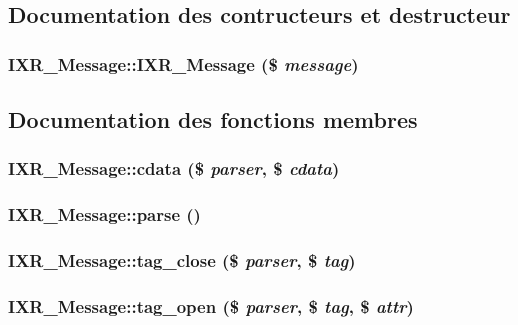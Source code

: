 \subsection{Documentation des contructeurs et destructeur}
\hypertarget{classIXR__Message_a0}{
\subsubsection[IXR\_\-Message]{\setlength{\rightskip}{0pt plus 5cm}IXR\_\-Message::IXR\_\-Message (\$ {\em message})}}
\label{classIXR__Message_a0}




\subsection{Documentation des fonctions membres}
\hypertarget{classIXR__Message_a3}{
\subsubsection[cdata]{\setlength{\rightskip}{0pt plus 5cm}IXR\_\-Message::cdata (\$ {\em parser}, \$ {\em cdata})}}
\label{classIXR__Message_a3}


\hypertarget{classIXR__Message_a1}{
\subsubsection[parse]{\setlength{\rightskip}{0pt plus 5cm}IXR\_\-Message::parse ()}}
\label{classIXR__Message_a1}


\hypertarget{classIXR__Message_a4}{
\subsubsection[tag\_\-close]{\setlength{\rightskip}{0pt plus 5cm}IXR\_\-Message::tag\_\-close (\$ {\em parser}, \$ {\em tag})}}
\label{classIXR__Message_a4}


\hypertarget{classIXR__Message_a2}{
\subsubsection[tag\_\-open]{\setlength{\rightskip}{0pt plus 5cm}IXR\_\-Message::tag\_\-open (\$ {\em parser}, \$ {\em tag}, \$ {\em attr})}}
\label{classIXR__Message_a2}




